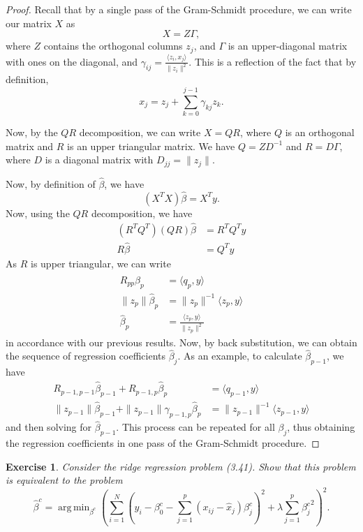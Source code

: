 \documentclass[12pt]{amsart}
\theoremstyle{plain}%
\newtheorem{exer}[thm]{Exercise}
\theoremstyle{definition}
\theoremstyle{remark}
\DeclareMathOperator*{\argmin}{arg\,min}
\begin{document}
\begin{proof}
    Recall that by a single pass of the Gram-Schmidt procedure, we can write our matrix $X$ as \[
        X = Z \Gamma,
        \] where $Z$ contains the orthogonal columns $z_j$, and $\Gamma$ is an upper-diagonal matrix with ones on the diagonal, and $\gamma_{ij} = \frac{\langle z_i, x_j \rangle}{\| z_i \|^2}$. This is a reflection of the fact that by definition, \[
            x_j = z_j + \sum_{k=0}^{j-1} \gamma_{kj} z_k.
            \]

            Now, by the $QR$ decomposition, we can write $X = QR$, where $Q$ is an orthogonal matrix and $R$ is an upper triangular matrix.  We have $Q = Z D^{-1}$ and $R = D\Gamma$, where $D$ is a diagonal matrix  with $D_{jj} = \| z_j \|$.  

    Now, by definition of $\hat \beta$, we have \[
        (X^T X) \hat \beta = X^T y.
        \]  Now, using the $QR$ decomposition, we have \begin{align*}
            (R^T Q^T) (QR) \hat \beta &= R^T Q^T y \\
            R \hat \beta &= Q^T y
        \end{align*}
    As $R$ is upper triangular, we can write \begin{align*}
        R_{pp} \hat \beta_p &= \langle q_p, y \rangle \\
        \| z_p \| \hat \beta_p &= \| z_p \|^{-1} \langle z_p, y \rangle \\
        \hat \beta_p &= \frac{\langle z_p, y \rangle}{\| z_p \|^2}
    \end{align*} in accordance with our previous results.  Now, by back substitution, we can obtain the sequence of regression coefficients $\hat \beta_j$.  As an example, to calculate $\hat \beta_{p-1}$, we have \begin{align*}
        R_{p-1, p-1} \hat \beta_{p-1} + R_{p-1,p} \hat \beta_p &= \langle q_{p-1}, y \rangle \\
        \| z_{p-1} \| \hat \beta_{p-1} + \| z_{p-1} \| \gamma_{p-1,p} \hat \beta_p &= \| z_{p-1} \|^{-1} \langle z_{p-1}, y \rangle 
    \end{align*} and then solving for $\hat \beta_{p-1}$. This process can be repeated for all $\beta_j$, thus obtaining the regression coefficients in one pass of the Gram-Schmidt procedure.
\end{proof}

\begin{exer}
    Consider the ridge regression problem (3.41).  Show that this problem is equivalent to the problem \[
        \hat \beta^c = \argmin_{\beta^c} \left( \sum_{i=1}^{N} \left( y_i - \beta^c_0 - \sum_{j=1}^{p}(x_{ij} - \hat x_j) \beta^c_j \right)^2 + \lambda \sum_{j=1}^{p}{\beta_j^c}^2 \right)^2.
        \]
\end{exer}
\end{document}
